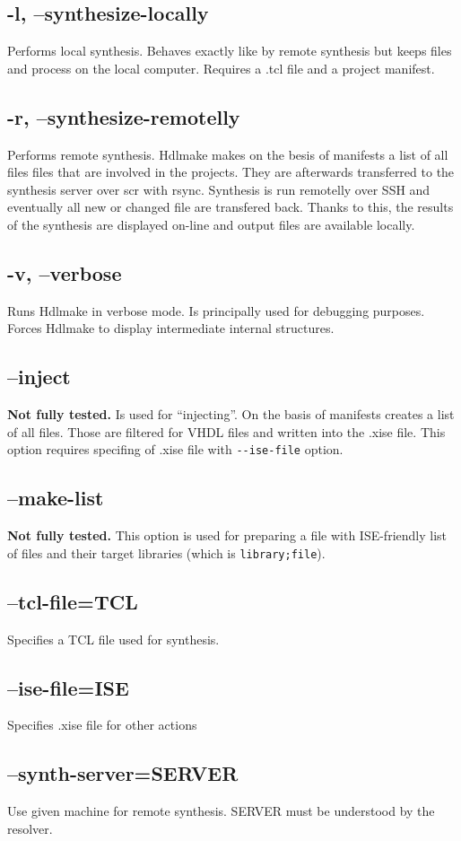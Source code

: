 \documentclass[a4paper,11pt]{article}
\begin{document}
\subsection*{-l, --synthesize-locally}
Performs local synthesis. Behaves exactly like by remote synthesis but keeps files and process on the local computer. Requires a .tcl file and a project manifest.
\subsection*{-r, --synthesize-remotelly}
Performs remote synthesis. Hdlmake makes on the besis of manifests a list of all files files that are involved in the projects. They are afterwards transferred to the synthesis server over scr with rsync. Synthesis is run remotelly over SSH and eventually all new or changed file are transfered back. Thanks to this, the results of the synthesis are displayed on-line and output files are available locally.
\subsection*{-v, --verbose}
Runs Hdlmake in verbose mode. Is principally used for debugging purposes. Forces Hdlmake to display intermediate internal structures.
\subsection*{--inject}
\textbf{Not fully tested.} Is used for ``injecting''. On the basis of manifests creates a list of all files. Those are filtered for VHDL files and written into the .xise file. This option requires specifing of .xise file with \verb!--ise-file! option.
\subsection*{--make-list}
\textbf{Not fully tested.} This option is used for preparing a file with ISE-friendly list of files and their target libraries (which is \verb!library;file!).
\subsection*{--tcl-file=TCL}
Specifies a TCL file used for synthesis.
\subsection*{--ise-file=ISE}
Specifies .xise file for other actions
\subsection*{--synth-server=SERVER}
Use given machine for remote synthesis. SERVER must be understood by the resolver.
\end{document}
